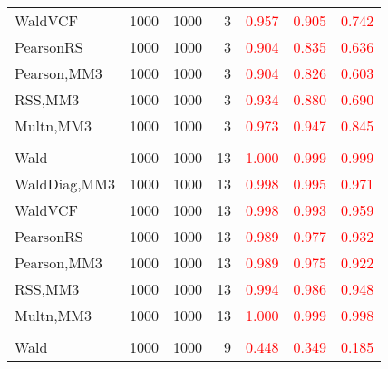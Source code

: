 \documentclass[
]{article}
\begin{document}
\begin{table}[H]
{\begin{tabular}[t]{lrrrrrr}
\hspace{1em}WaldVCF & 1000 & 1000 & 3 & \textcolor{red}{0.957} & \textcolor{red}{0.905} & \textcolor{red}{0.742}\\
\hspace{1em}PearsonRS & 1000 & 1000 & 3 & \textcolor{red}{0.904} & \textcolor{red}{0.835} & \textcolor{red}{0.636}\\
\hspace{1em}Pearson,MM3 & 1000 & 1000 & 3 & \textcolor{red}{0.904} & \textcolor{red}{0.826} & \textcolor{red}{0.603}\\
\hspace{1em}RSS,MM3 & 1000 & 1000 & 3 & \textcolor{red}{0.934} & \textcolor{red}{0.880} & \textcolor{red}{0.690}\\
\hspace{1em}Multn,MM3 & 1000 & 1000 & 3 & \textcolor{red}{0.973} & \textcolor{red}{0.947} & \textcolor{red}{0.845}\\
\addlinespace[0.3em]
\multicolumn{7}{l}{\textbf{1F 15V}}\\
\hspace{1em}Wald & 1000 & 1000 & 13 & \textcolor{red}{1.000} & \textcolor{red}{0.999} & \textcolor{red}{0.999}\\
\hspace{1em}WaldDiag,MM3 & 1000 & 1000 & 13 & \textcolor{red}{0.998} & \textcolor{red}{0.995} & \textcolor{red}{0.971}\\
\hspace{1em}WaldVCF & 1000 & 1000 & 13 & \textcolor{red}{0.998} & \textcolor{red}{0.993} & \textcolor{red}{0.959}\\
\hspace{1em}PearsonRS & 1000 & 1000 & 13 & \textcolor{red}{0.989} & \textcolor{red}{0.977} & \textcolor{red}{0.932}\\
\hspace{1em}Pearson,MM3 & 1000 & 1000 & 13 & \textcolor{red}{0.989} & \textcolor{red}{0.975} & \textcolor{red}{0.922}\\
\hspace{1em}RSS,MM3 & 1000 & 1000 & 13 & \textcolor{red}{0.994} & \textcolor{red}{0.986} & \textcolor{red}{0.948}\\
\hspace{1em}Multn,MM3 & 1000 & 1000 & 13 & \textcolor{red}{1.000} & \textcolor{red}{0.999} & \textcolor{red}{0.998}\\
\addlinespace[0.3em]
\multicolumn{7}{l}{\textbf{2F 10V}}\\
\hspace{1em}Wald & 1000 & 1000 & 9 & \textcolor{red}{0.448} & \textcolor{red}{0.349} & \textcolor{red}{0.185}\\

\end{tabular}}
\end{table}
\end{document}
